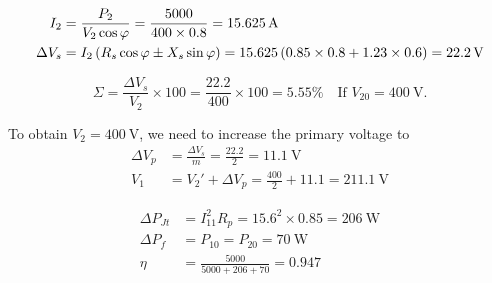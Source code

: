 \documentclass{report}
\begin{document}
{\begin{enumerate}
		\ii
		\begin{align*}
			I_2        & = \frac{P_2}{V_2\cos\varphi} = \frac{5000}{400 \times 0.8} = \SI{15.625}{\ampere}                                           \\
			\Delta V_s & = I_2 \left( R_s \cos\varphi \pm X_s \sin\varphi \right) = 15.625 \left( 0.85 \times 0.8 + 1.23 \times 0.6 \right) = \SI{22.2}{\volt} \\
		\end{align*}

		\[
			\Sigma = \frac{\Delta V_s}{V_2} \times 100 = \frac{22.2}{400} \times 100 = 5.55\% \quad \text{If } V_{20} = \SI{400}{\volt}
			.\]

		To obtain $V_2=\SI{400}{\volt}$, we need to increase the primary voltage to
		\begin{align*}
			\Delta V_p & = \frac{\Delta V_s}{m} = \frac{22.2}{2} = \SI{11.1}{\volt}     \\
			V_1        & = V_2' + \Delta V_p = \frac{400}{2} + 11.1 = \SI{211.1}{\volt}
		\end{align*}

		\ii
		\begin{align*}
			\Delta P_{Jt} & = I_{11}^2R_p = 15.6^2 \times 0.85 = \SI{206}{\watt} \\
			\Delta P_f    & = P_{10} = P_{20} = \SI{70}{\watt}                   \\
			\eta          & = \frac{5000}{5000 + 206 + 70} = 0.947
		\end{align*}
	\end{enumerate}
}
\end{document}
